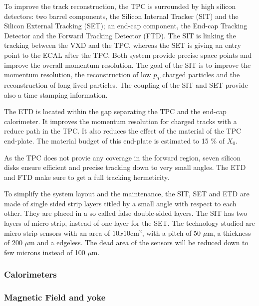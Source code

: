       To improve the track reconstruction, the TPC is surrounded by high silicon detectors: two barrel components, the Silicon Internal Tracker (SIT) and the Silicon External Tracking (SET); an end-cap component, the End-cap Tracking Detector and the Forward Tracking Detector (FTD).
      The SIT is linking the tracking between the VXD and the TPC, whereas the SET is giving an entry point to the ECAL after the TPC.
      Both system provide precise space points and improve the overall momentum resolution.
      The goal of the SIT is to improve the momentum resolution, the reconstruction of low $p_{T}$ charged particles and the reconstruction of long lived particles.
      The coupling of the SIT and SET provide also a time stamping information.

      The ETD is located within the gap separating the TPC and the end-cap calorimeter. 
      It improves the momentum resolution for charged tracks with a reduce path in the TPC.
      It also reduces the effect of the material of the TPC end-plate. 
      The material budget of this end-plate is estimated to 15 \% of $X_0$.

      As the TPC does not provie any coverage in the forward region, seven silicon disks ensure efficient and precise tracking down to very small angles.
      The ETD and FTD make sure to get a full tracking hermeticity.

      To simplify the system layout and the maintenance, the SIT, SET and ETD are made of single sided strip layers titled by a small angle with respect to each other. 
      They are placed in a so called false double-sided layers.
      The SIT has two layers of micro-strip, instead of one layer for the SET. 
      The technology studied are micro-strip sensors with an area of $10x10 \text{cm}^2$, with a pitch of 50 $\mu$m, a thickness of 200 $\mu$m and a edgeless.
      The dead area of the sensors will be reduced down to few microns instead of 100 $\mu$m.



      \subsubsection{Calorimeters}


      \subsubsection{Magnetic Field and yoke}
